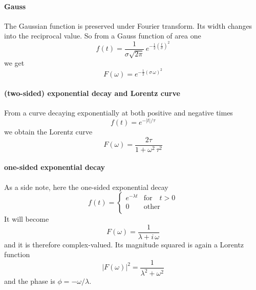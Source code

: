 \paragraph{Gauss} The Gaussian function is preserved under Fourier transform. Its width changes into the reciprocal value. So from a Gauss function of area one
\begin{equation}
 f(t) = \frac{1}{\sigma \sqrt{2 \pi}} \, e^{- \frac{1}{2} \left( \frac{t}{\sigma} \right)^2}
\end{equation}
we get
\begin{equation}
 F(\omega) = e^{- \frac{1}{2} \left( \sigma \, \omega \right) ^2 }
\end{equation}



\paragraph{(two-sided) exponential decay and Lorentz curve} From a curve decaying exponentially at both positive and negative times
\begin{equation}
 f(t) = e^{- |t| / \tau}
\end{equation}
we obtain the Lorentz curve
\begin{equation}
 F(\omega) = \frac{2 \tau}{1 + \omega^2 \, \tau^2}
\end{equation}


\paragraph{one-sided exponential decay} As a side note, here  the one-sided exponential decay
\begin{equation}
 f(t) = \left\{ \begin{array}{ll}
e^{- \lambda t } & \text{for} \quad t > 0 \\
 0 & \text{other} \\
 \end{array}
 \right.
\end{equation}
It will become
\begin{equation}
 F(\omega) = \frac{1}{\lambda + i \, \omega}
\end{equation}
and it is therefore complex-valued. Its magnitude squared is again a Lorentz function
\begin{equation}
| F(\omega)|^2 = \frac{1}{\lambda^2 + \omega^2}
\end{equation}
and the phase is $\phi = - \omega / \lambda$.


